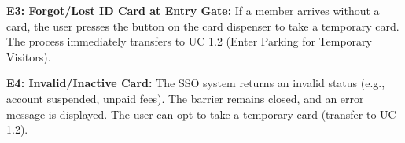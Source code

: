 \begin{longtblr}[
  caption = {UC 1.1. Enter Parking for Learners/Faculty Members},
]
\textbf{E3: Forgot/Lost ID Card at Entry Gate:} If a member arrives without a card, the user presses the button on the card dispenser to take a temporary card. The process immediately transfers to UC 1.2 (Enter Parking for Temporary Visitors). \par \vspace{0.5em}
\textbf{E4: Invalid/Inactive Card:} The SSO system returns an invalid status (e.g., account suspended, unpaid fees). The barrier remains closed, and an error message is displayed. The user can opt to take a temporary card (transfer to UC 1.2). \\
\end{longtblr}